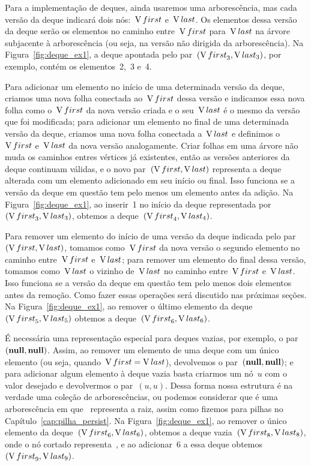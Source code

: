 \documentclass[../../main.tex]{subfiles}
\begin{document}
Para a implementação de deques, ainda usaremos uma arborescência, mas cada versão da deque indicará dois nós:~$\operatorname{V}{first}$ e~$\operatorname{V}{last}$. Os elementos dessa versão da deque serão os elementos no caminho entre~$\operatorname{V}{first}$ para~$\operatorname{V}{last}$ na árvore subjacente à arborescência (ou seja, na versão não dirigida da arborescência). Na Figura~\ref{fig:deque_ex1}, a deque apontada pelo par~$(\operatorname{V}{first}_3, \operatorname{V}{last}_3)$, por exemplo, contém os elementos~2,~3 e~4.

Para adicionar um elemento no início de uma determinada versão da deque, criamos uma nova folha conectada ao~$\operatorname{V}{first}$ dessa versão e indicamos essa nova folha como o~$\operatorname{V}{first}$ da nova versão criada e o seu~$\operatorname{V}{last}$ é o mesmo da versão que foi modificada; para adicionar um elemento no final de uma determinada versão da deque, criamos uma nova folha conectada a~$\operatorname{V}{last}$ e definimos o~$\operatorname{V}{first}$ e~$\operatorname{V}{last}$ da nova versão analogamente. Criar folhas em uma árvore não muda os caminhos entres vértices já existentes, então as versões anteriores da deque continuam válidas, e o novo par~$(\operatorname{V}{first}, \operatorname{V}{last})$ representa a deque alterada com um elemento adicionado em seu início ou final. Isso funciona se a versão da deque em questão tem pelo menos um elemento antes da adição. Na Figura~\ref{fig:deque_ex1}, ao inserir~1 no início da deque representada por~$(\operatorname{V}{first}_3, \operatorname{V}{last_3})$, obtemos a deque~$(\operatorname{V}{first}_4, \operatorname{V}{last}_4)$.

Para remover um elemento do início de uma versão da deque indicada pelo par~$(\operatorname{V}{first}, \operatorname{V}{last})$, tomamos como~$\operatorname{V}{first}$ da nova versão o segundo elemento no caminho entre~$\operatorname{V}{first}$ e~$\operatorname{V}{last}$; para remover um elemento do final dessa versão, tomamos como~$\operatorname{V}{last}$ o vizinho de~$\operatorname{V}{last}$ no caminho entre~$\operatorname{V}{first}$ e~$\operatorname{V}{last}$. Isso funciona se a versão da deque em questão tem pelo menos dois elementos antes da remoção. Como fazer essas operações será discutido nas próximas seções. Na Figura~\ref{fig:deque_ex1}, ao remover o último elemento da deque~$(\operatorname{V}{first}_5, \operatorname{V}{last}_5)$ obtemos a deque~$(\operatorname{V}{first}_6, \operatorname{V}{last}_6)$.

É necessária uma representação especial para deques vazias, por exemplo, o par~$(\textbf{null}, \textbf{null})$. Assim, ao remover um elemento de uma deque com um único elemento (ou seja, quando~$\operatorname{V}{first}=\operatorname{V}{last}$), devolvemos o par~$(\textbf{null}, \textbf{null})$; e para adicionar algum elemento à deque vazia basta criarmos um nó~$u$ com o valor desejado e devolvermos o par~$(u, u)$. Dessa forma nossa estrutura é na verdade uma coleção de arborescências, ou podemos considerar que é uma arborescência em que~ representa a raiz, assim como fizemos para pilhas no Capítulo~\ref{cap:pilha_persist}. Na Figura~\ref{fig:deque_ex1}, ao remover o único elemento da deque~$(\operatorname{V}{first}_6, \operatorname{V}{last}_6)$, obtemos a deque vazia~$(\operatorname{V}{first}_8, \operatorname{V}{last}_8)$, onde o nó cortado representa~, e ao adicionar~6 a essa deque obtemos~$(\operatorname{V}{first}_9, \operatorname{V}{last}_9)$.
\end{document}
